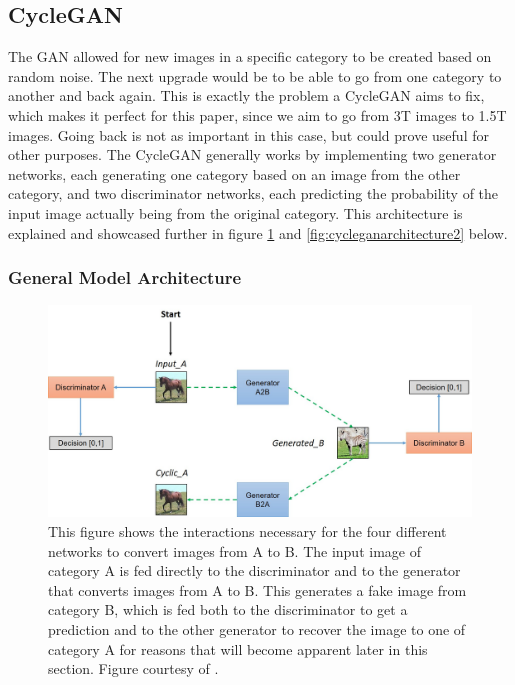 \documentclass[11pt, fleqn, titlepage]{article}
\newcommand{\1}[1]{\mathds{1}\left[#1\right]}
\begin{document}
\subsection{CycleGAN}\label{cyclegan}
The GAN allowed for new images in a specific category to be created based on random noise. The next upgrade would be to be able to go from one category to another and back again. This is exactly the problem a CycleGAN aims to fix, which makes it perfect for this paper, since we aim to go from 3T images to 1.5T images. Going back is not as important in this case, but could prove useful for other purposes. The CycleGAN generally works by implementing two generator networks, each generating one category based on an image from the other category, and two discriminator networks, each predicting the probability of the input image actually being from the original category. This architecture is explained and showcased further in figure \ref{fig:cycleganarchitecture} and \ref{fig:cycleganarchitecture2} below.

\subsubsection{General Model Architecture}
\begin{figure}[H]
	\centering
	\includegraphics[width=0.7\linewidth]{imgs/cyclegan_architecture}
	\caption{This figure shows the interactions necessary for the four different networks to convert images from A to B. The input image of category A is fed directly to the discriminator and to the generator that converts images from A to B. This generates a fake image from category B, which is fed both to the discriminator to get a prediction and to the other generator to recover the image to one of category A for reasons that will become apparent later in this section. Figure courtesy of \cite{model_architecture}.}
	\label{fig:cycleganarchitecture}
\end{figure}
\end{document}
